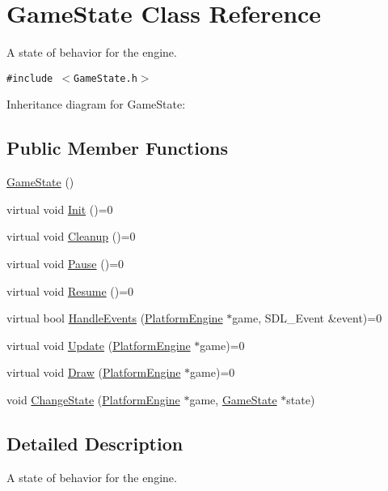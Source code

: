 \hypertarget{class_game_state}{
\section{GameState Class Reference}
\label{dd/d87/class_game_state}
}
A state of behavior for the engine.  


{\tt \#include $<$GameState.h$>$}

Inheritance diagram for GameState:\subsection*{Public Member Functions}
\begin{CompactItemize}
\item 
\hyperlink{class_game_state_4fa0a2bf50315c4a35a3890a0adcee5c}{GameState} ()
\item 
virtual void \hyperlink{class_game_state_eec488593bae214c0f738bd64dafba32}{Init} ()=0
\item 
virtual void \hyperlink{class_game_state_041e7a5430d71da84745af11abdacd93}{Cleanup} ()=0
\item 
virtual void \hyperlink{class_game_state_1f4d2b5a2e4dcb7645e3e7a5735926a6}{Pause} ()=0
\item 
virtual void \hyperlink{class_game_state_cf9bcd5b47ebb3f572389f64c5ca5ed4}{Resume} ()=0
\item 
virtual bool \hyperlink{class_game_state_de7bd9bda91253614322ca0ea77b7a14}{HandleEvents} (\hyperlink{class_platform_engine}{PlatformEngine} $\ast$game, SDL\_\-Event \&event)=0
\item 
virtual void \hyperlink{class_game_state_100ca49bc95afce1d5c5b756708bbc2b}{Update} (\hyperlink{class_platform_engine}{PlatformEngine} $\ast$game)=0
\item 
virtual void \hyperlink{class_game_state_7333dda0f49b3fa1c01cd3295f853024}{Draw} (\hyperlink{class_platform_engine}{PlatformEngine} $\ast$game)=0
\item 
void \hyperlink{class_game_state_f786aeb704a22a135dc289bb89fcc452}{ChangeState} (\hyperlink{class_platform_engine}{PlatformEngine} $\ast$game, \hyperlink{class_game_state}{GameState} $\ast$state)
\end{CompactItemize}


\subsection{Detailed Description}
A state of behavior for the engine. 

